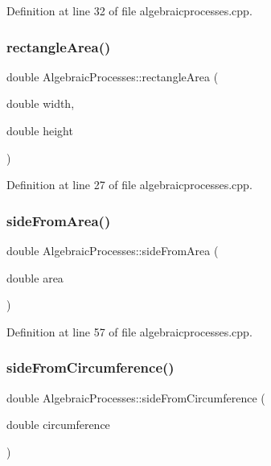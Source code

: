 Definition at line 32 of file algebraicprocesses.\+cpp.

\mbox{\label{class_algebraic_processes_ac3b29221b6fe85534272cb75ffb9ae36}} 
\subsubsection{\texorpdfstring{rectangle\+Area()}{rectangleArea()}}
{\footnotesize\ttfamily double Algebraic\+Processes\+::rectangle\+Area (\begin{DoxyParamCaption}\item[{double}]{width,  }\item[{double}]{height }\end{DoxyParamCaption})}



Definition at line 27 of file algebraicprocesses.\+cpp.

\mbox{\label{class_algebraic_processes_a21eb5b5f32ef6214bde530e4b3c043e6}} 
\subsubsection{\texorpdfstring{side\+From\+Area()}{sideFromArea()}}
{\footnotesize\ttfamily double Algebraic\+Processes\+::side\+From\+Area (\begin{DoxyParamCaption}\item[{double}]{area }\end{DoxyParamCaption})}



Definition at line 57 of file algebraicprocesses.\+cpp.

\mbox{\label{class_algebraic_processes_aff19adfe08028c3272c4c3208b0c9605}} 
\subsubsection{\texorpdfstring{side\+From\+Circumference()}{sideFromCircumference()}}
{\footnotesize\ttfamily double Algebraic\+Processes\+::side\+From\+Circumference (\begin{DoxyParamCaption}\item[{double}]{circumference }\end{DoxyParamCaption})}



